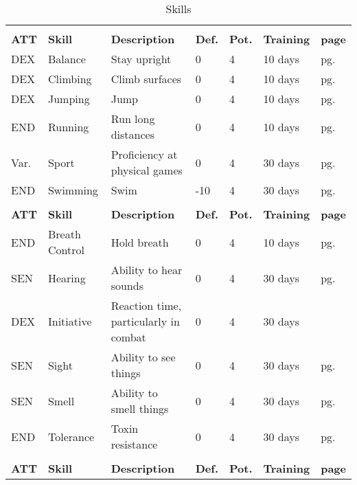 \begin{center}
    \unclassedrowcolors
    \begin{xltabular}{\textwidth}{l l X l l l l}
        \caption{Skills}\label{tab:skills} \endfoot
         \\*
        \textbf{ATT} & \textbf{Skill} & \textbf{Description} & \textbf{Def.} & \textbf{Pot.} & \textbf{Training} & \textbf{page} \\*
        DEX & Balance & Stay upright & 0 & 4 & 10 days & pg. \pageref{skill:balance} \\
        DEX & Climbing & Climb surfaces & 0 & 4 & 10 days & pg. \pageref{skill:climbing} \\
        DEX & Jumping & Jump & 0 & 4 & 10 days & pg. \pageref{skill:jumping} \\
        END & Running & Run long distances & 0 & 4 & 10 days & pg. \pageref{skill:running} \\
        Var. & Sport & Proficiency at physical games & 0 & 4 & 30 days & pg. \pageref{skill:sport} \\
        END & Swimming & Swim & -10 & 4 & 30 days & pg. \pageref{skill:swimming} \\
         \\*
        \textbf{ATT} & \textbf{Skill} & \textbf{Description} & \textbf{Def.} & \textbf{Pot.} & \textbf{Training} & \textbf{page} \\*
        END & Breath Control & Hold breath & 0 & 4 & 10 days & pg. \pageref{skill:hearing} \\
        SEN & Hearing & Ability to hear sounds & 0 & 4 & 30 days & pg. \pageref{skill:hearing} \\
        DEX & Initiative & Reaction time, particularly in combat & 0 & 4 & 30 days & \pageref{skill:initiative} \\ %
        SEN & Sight & Ability to see things & 0 & 4 & 30 days & pg. \pageref{skill:sight} \\
        SEN & Smell & Ability to smell things & 0 & 4 & 30 days & pg. \pageref{skill:smell} \\
        END & Tolerance & Toxin resistance & 0 & 4 & 30 days & pg. \pageref{skill:tolerance} \\
         \\*
        \textbf{ATT} & \textbf{Skill} & \textbf{Description} & \textbf{Def.} & \textbf{Pot.} & \textbf{Training} & \textbf{page} \\*

\end{xltabular}
\end{center}
